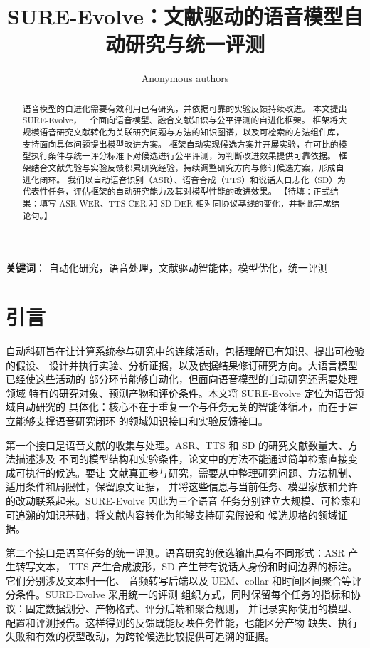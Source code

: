 \documentclass{article}
\title{SURE-Evolve：文献驱动的语音模型自动研究与统一评测}
\author{Anonymous authors}
\newcommand{\pending}[1]{\textcolor{blue!65!black}{【待填：#1】}}
\newenvironment{keywords}{\vspace{.5em}\noindent\textbf{关键词}：}{\par}
\begin{document}
\maketitle
\raggedbottom

\begin{abstract}
语音模型的自进化需要有效利用已有研究，并依据可靠的实验反馈持续改进。
本文提出 SURE-Evolve，一个面向语音模型、融合文献知识与公平评测的自进化框架。
框架将大规模语音研究文献转化为关联研究问题与方法的知识图谱，以及可检索的方法组件库，支持面向具体问题提出模型改进方案。
框架自动实现候选方案并开展实验，在可比的模型执行条件与统一评分标准下对候选进行公平评测，为判断改进效果提供可靠依据。
框架结合文献先验与实验反馈积累研究经验，持续调整研究方向与修订候选方案，形成自进化闭环。
我们以自动语音识别（ASR）、语音合成（TTS）和说话人日志化（SD）为代表性任务，评估框架的自动研究能力及其对模型性能的改进效果。
\pending{正式结果：填写 ASR WER、TTS CER 和 SD DER
相对同协议基线的变化，并据此完成结论句。}
\end{abstract}

\begin{keywords}
自动化研究，语音处理，文献驱动智能体，模型优化，统一评测
\end{keywords}

\section{引言}
\label{sec:intro}

自动科研旨在让计算系统参与研究中的连续活动，包括理解已有知识、提出可检验的假设、
设计并执行实验、分析证据，以及依据结果修订研究方向。大语言模型已经使这些活动的
部分环节能够自动化\citep{lu2024aiscientist}，但面向语音模型的自动研究还需要处理领域
特有的研究对象、预测产物和评价条件。本文将 SURE-Evolve 定位为语音领域自动研究的
具体化：核心不在于重复一个与任务无关的智能体循环，而在于建立能够支撑语音研究闭环
的领域知识接口和实验反馈接口。

第一个接口是语音文献的收集与处理。ASR、TTS 和 SD 的研究文献数量大、方法描述涉及
不同的模型结构和实验条件，论文中的方法不能通过简单检索直接变成可执行的候选。要让
文献真正参与研究，需要从中整理研究问题、方法机制、适用条件和局限性，保留原文证据，
并将这些信息与当前任务、模型家族和允许的改动联系起来。SURE-Evolve 因此为三个语音
任务分别建立大规模、可检索和可追溯的知识基础，将文献内容转化为能够支持研究假设和
候选规格的领域证据。

第二个接口是语音任务的统一评测。语音研究的候选输出具有不同形式：ASR 产生转写文本，
TTS 产生合成波形，SD 产生带有说话人身份和时间边界的标注。它们分别涉及文本归一化、
音频转写后端以及 UEM、collar 和时间区间聚合等评分条件。SURE-Evolve 采用统一的评测
组织方式，同时保留每个任务的指标和协议：固定数据划分、产物格式、评分后端和聚合规则，
并记录实际使用的模型、配置和评测报告。这样得到的反馈既能反映任务性能，也能区分产物
缺失、执行失败和有效的模型改动，为跨轮候选比较提供可追溯的证据。
\end{document}
